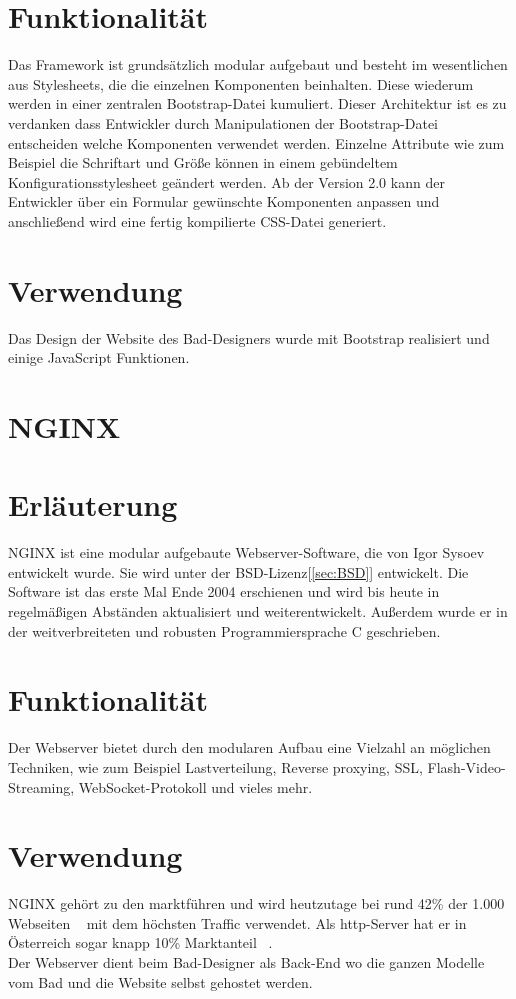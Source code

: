 \section*{Funktionalität}
Das Framework ist grundsätzlich modular aufgebaut und besteht im wesentlichen aus Stylesheets, die die einzelnen Komponenten beinhalten. Diese wiederum werden in einer zentralen Bootstrap-Datei kumuliert. Dieser Architektur ist es zu verdanken dass Entwickler durch Manipulationen der Bootstrap-Datei entscheiden welche Komponenten verwendet werden. Einzelne Attribute wie zum Beispiel die Schriftart und Größe können in einem gebündeltem Konfigurationsstylesheet geändert werden. Ab der Version 2.0 kann der Entwickler über ein Formular gewünschte Komponenten anpassen und anschließend wird eine fertig kompilierte CSS-Datei generiert. 
\section*{Verwendung}
Das Design der Website des Bad-Designers wurde mit Bootstrap realisiert und einige JavaScript Funktionen.

\newpage
\clearpage 

\section{NGINX}\label{sec:NGINX}
\cite{nginx_wiki} \cite{wiki_nginx}
\section*{Erläuterung} 
NGINX ist eine modular aufgebaute Webserver-Software, die von Igor Sysoev entwickelt wurde. Sie wird unter der BSD-Lizenz[\ref{sec:BSD}] entwickelt. Die Software ist das erste Mal Ende 2004 erschienen und wird bis heute in regelmäßigen Abständen aktualisiert und weiterentwickelt. Außerdem wurde er in der weitverbreiteten und robusten Programmiersprache C geschrieben.

\section*{Funktionalität}
Der Webserver bietet durch den modularen Aufbau eine Vielzahl an möglichen Techniken, wie zum Beispiel Lastverteilung, Reverse proxying, SSL, Flash-Video-Streaming, WebSocket-Protokoll und vieles mehr. 

\section*{Verwendung}
NGINX gehört zu den marktführen und wird heutzutage bei rund
 42\% der 1.000 Webseiten ~\cite{nginxWorldWide} mit dem höchsten Traffic verwendet. 
 Als http-Server hat er in Österreich sogar knapp 10\% Marktanteil ~\cite{nginxAT}. 
\\
Der Webserver dient beim Bad-Designer als Back-End wo die ganzen Modelle vom Bad und die Website selbst gehostet werden.




